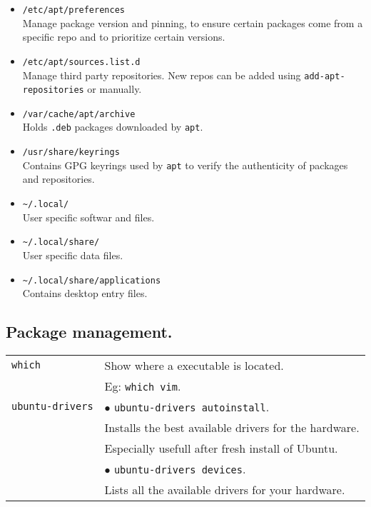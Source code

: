 \begin{itemize}
    \item \texttt{/etc/apt/preferences}\\
            Manage package version and pinning, to ensure certain packages come from a specific repo and to prioritize certain versions.\\
    \item \texttt{/etc/apt/sources.list.d}\\
            Manage third party repositories. New repos can be added using \texttt{add-apt-repositories} or manually.\\
    \item \texttt{/var/cache/apt/archive}\\
            Holds \texttt{.deb} packages downloaded by \texttt{apt}.
    \item \texttt{/usr/share/keyrings}\\
            Contains GPG keyrings used by \texttt{apt} to verify the authenticity of packages and repositories.\\
\end{itemize}

\vfill\null
\columnbreak

\begin{itemize}
    \item \texttt{\~{}/.local/}\\
            User specific softwar and files.\\
    \item \texttt{\~{}/.local/share/}\\
            User specific data files.\\
    \item \texttt{\~{}/.local/share/applications}\\
            Contains desktop entry files.\\
\end{itemize}



\subsection{Package management.}

\begin{tabularx}{\linewidth}{lX}
    \texttt{which}              & Show where a executable is located.\\
                                & Eg: \texttt{which vim}.\\
    \hline
    \texttt{ubuntu-drivers}     & $\bullet$ \texttt{ubuntu-drivers autoinstall}.\\
                                & Installs the best available drivers for the hardware.\\
                                & Especially usefull after fresh install of Ubuntu.\\
                                & $\bullet$ \texttt{ubuntu-drivers devices}.\\
                                & Lists all the available drivers for your hardware.\\ 
    \hline
\end{tabularx}


